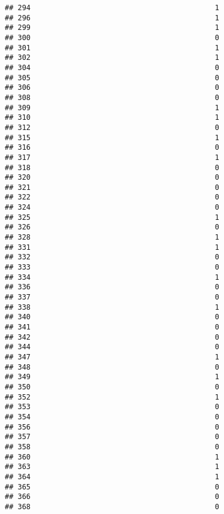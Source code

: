 \documentclass[
]{article}
\begin{document}
\begin{verbatim}
## 294                                           1
## 296                                           1
## 299                                           1
## 300                                           0
## 301                                           1
## 302                                           1
## 304                                           0
## 305                                           0
## 306                                           0
## 308                                           0
## 309                                           1
## 310                                           1
## 312                                           0
## 315                                           1
## 316                                           0
## 317                                           1
## 318                                           0
## 320                                           0
## 321                                           0
## 322                                           0
## 324                                           0
## 325                                           1
## 326                                           0
## 328                                           1
## 331                                           1
## 332                                           0
## 333                                           0
## 334                                           1
## 336                                           0
## 337                                           0
## 338                                           1
## 340                                           0
## 341                                           0
## 342                                           0
## 344                                           0
## 347                                           1
## 348                                           0
## 349                                           1
## 350                                           0
## 352                                           1
## 353                                           0
## 354                                           0
## 356                                           0
## 357                                           0
## 358                                           0
## 360                                           1
## 363                                           1
## 364                                           1
## 365                                           0
## 366                                           0
## 368                                           0

\end{verbatim}
\end{document}

